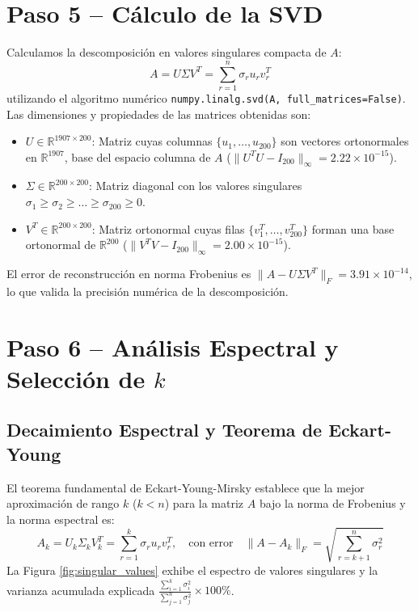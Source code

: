 \documentclass[11pt,a4paper]{article}
\begin{document}
\section{Paso 5 -- Cálculo de la SVD}
Calculamos la descomposición en valores singulares compacta de $A$:
\begin{equation}
    A = U \Sigma V^T = \sum_{r=1}^n \sigma_r u_r v_r^T
\end{equation}
utilizando el algoritmo numérico \texttt{numpy.linalg.svd(A, full\_matrices=False)}. Las dimensiones y propiedades de las matrices obtenidas son:
\begin{itemize}
    \item $U \in \mathbb{R}^{1907 \times 200}$: Matriz cuyas columnas $\{u_1, \dots, u_{200}\}$ son vectores ortonormales en $\mathbb{R}^{1907}$, base del espacio columna de $A$ ($\|U^T U - I_{200}\|_\infty = 2.22 \times 10^{-15}$).
    \item $\Sigma \in \mathbb{R}^{200 \times 200}$: Matriz diagonal con los valores singulares $\sigma_1 \ge \sigma_2 \ge \dots \ge \sigma_{200} \ge 0$.
    \item $V^T \in \mathbb{R}^{200 \times 200}$: Matriz ortonormal cuyas filas $\{v_1^T, \dots, v_{200}^T\}$ forman una base ortonormal de $\mathbb{R}^{200}$ ($\|V^T V - I_{200}\|_\infty = 2.00 \times 10^{-15}$).
\end{itemize}
El error de reconstrucción en norma Frobenius es $\|A - U \Sigma V^T\|_F = 3.91 \times 10^{-14}$, lo que valida la precisión numérica de la descomposición.

\section{Paso 6 -- Análisis Espectral y Selección de $k$}
\subsection{Decaimiento Espectral y Teorema de Eckart-Young}
El teorema fundamental de Eckart-Young-Mirsky establece que la mejor aproximación de rango $k$ ($k < n$) para la matriz $A$ bajo la norma de Frobenius y la norma espectral es:
\begin{equation}
    A_k = U_k \Sigma_k V_k^T = \sum_{r=1}^k \sigma_r u_r v_r^T, \quad \text{con error} \quad \|A - A_k\|_F = \sqrt{\sum_{r=k+1}^n \sigma_r^2}
\end{equation}
La Figura \ref{fig:singular_values} exhibe el espectro de valores singulares y la varianza acumulada explicada $\frac{\sum_{i=1}^k \sigma_i^2}{\sum_{j=1}^n \sigma_j^2} \times 100\%$.
\end{document}
